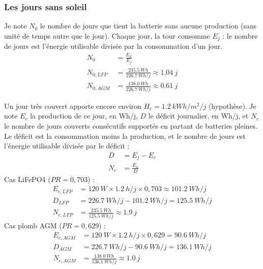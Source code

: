 \subsubsection*{Les jours sans soleil}

\begin{demonstration}
Je note $N_0$ le nombre de jours que tient la batterie sans aucune production (sans unité de temps autre que le jour). Chaque jour, la tour consomme $E_j$ : le nombre de jours est l'énergie utilisable divisée par la consommation d'un jour.
\begin{align*}
N_0 &= \frac{E_u}{E_j}\\
N_{0,LFP} &= \frac{\qty{235,5}{Wh}}{\qty{226,7}{Wh/j}} \approx \qty{1,04}{j}\\
N_{0,AGM} &= \frac{\qty{138,0}{Wh}}{\qty{226,7}{Wh/j}} \approx \qty{0,61}{j}
\end{align*}
\end{demonstration}

\begin{demonstration}
Un jour très couvert apporte encore environ $H_c = \qty{1,2}{kWh/m^2/j}$ (hypothèse). Je note $E_c$ la production de ce jour, en Wh/j, $D$ le déficit journalier, en Wh/j, et $N_c$ le nombre de jours couverts consécutifs supportés en partant de batteries pleines. Le déficit est la consommation moins la production, et le nombre de jours est l'énergie utilisable divisée par le déficit :
\begin{align*}
D &= E_j - E_c\\
N_c &= \frac{E_u}{D}
\end{align*}
Cas LiFePO4 ($PR = 0{,}703$) :
\begin{align*}
E_{c,LFP} &= \qty{120}{W} \times \qty{1,2}{h/j} \times 0{,}703 \approx \qty{101,2}{Wh/j}\\
D_{LFP} &= \qty{226,7}{Wh/j} - \qty{101,2}{Wh/j} = \qty{125,5}{Wh/j}\\
N_{c,LFP} &= \frac{\qty{235,5}{Wh}}{\qty{125,5}{Wh/j}} \approx \qty{1,9}{j}
\end{align*}
Cas plomb AGM ($PR = 0{,}629$) :
\begin{align*}
E_{c,AGM} &= \qty{120}{W} \times \qty{1,2}{h/j} \times 0{,}629 = \qty{90,6}{Wh/j}\\
D_{AGM} &= \qty{226,7}{Wh/j} - \qty{90,6}{Wh/j} = \qty{136,1}{Wh/j}\\
N_{c,AGM} &= \frac{\qty{138,0}{Wh}}{\qty{136,1}{Wh/j}} \approx \qty{1,0}{j}
\end{align*}
\end{demonstration}

